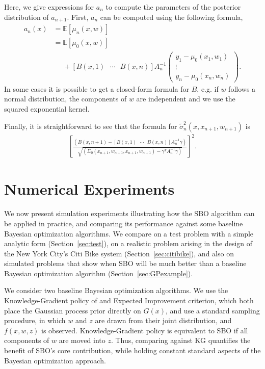 \documentclass{article}
\newcommand{\w}{w}
\newcommand{\z}{z}
\newcommand{\sigmatilde}{\tilde{\sigma}}
\begin{document}
Here, we give expressions for $a_n$  to compute the parameters of the posterior distribution of $a_{n+1}$. First,
$a_{n}$ can be computed using the following formula,
\begin{align*}
a_{n}\left(x\right) &= \mathbb{E}\left[\mu_{n}\left(x,\w\right)\right]\\
 &= \mathbb{E}\left[\mu_{0}\left(x,\w\right)\right]\\
 &\phantom{{}=}+\left[B\left(x,1\right)\mbox{ }\cdots\mbox{ }B\left(x,n\right)\right]A_{n}^{-1}\left(\begin{array}{c}
y_{1}-\mu_{0}\left(x_{1},\w_{1}\right)\\
\vdots\\
y_{n}-\mu_{0}\left(x_{n},\w_{n}\right)
\end{array}\right).
\end{align*}
In some cases it is possible to get a closed-form formula for $B$, e.g. if $\w$ follows a normal distribution, the components of $\w$ are independent and we use the squared exponential kernel.

Finally,  it is straightforward to see that the formula for $\sigmatilde^2_{n}\left(x,x_{n+1},\w_{n+1}\right)$ is
\begin{align*}
\left[\frac{\left(B\left(x,n+1\right)-\left[B\left(x,1\right)\mbox{ }\cdots\mbox{ }B\left(x,n\right)\right]A_{n}^{-1}\gamma\right)}{\sqrt{\left(\Sigma_{0}\left(x_{n+1},\w_{n+1},x_{n+1},\w_{n+1}\right)-\gamma^{T}A_{n}^{-1}\gamma\right)}}\right]^{2}.
\end{align*}

\section{Numerical Experiments}
\label{experiments}

We now present simulation experiments illustrating how the SBO algorithm can be applied in practice, and comparing its performance against some baseline Bayesian optimization algorithms.  We compare on a test problem with a simple analytic form (Section~\ref{sec:test}), on a realistic problem arising in the design of the New York City's Citi Bike system (Section~\ref{sec:citibike}), and also on simulated problems that show when SBO will be much better than a baseline Bayesian optimization algorithm (Section~\ref{sec:GPexample}).

We consider two baseline Bayesian optimization algorithms. We use the Knowledge-Gradient policy of \cite{frazier2009knowledge} and Expected Improvement criterion, which both place the Gaussian process prior directly on $G(x)$, and use a standard sampling procedure, in which $\w$ and $\z$ are drawn from their joint distribution, and $f(x,\w,\z)$ is observed. Knowledge-Gradient policy is equivalent to SBO if all components of $\w$ are moved into $\z$.  Thus, comparing against KG quantifies the benefit of SBO's core contribution, while holding constant standard aspects of the Bayesian optimization approach. 
\end{document}
